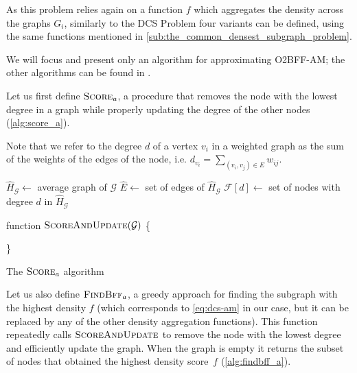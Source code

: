 As this problem relies again on a function $f$ which aggregates the density
across the graphs $G_i$, similarly to the \acrshort{DCS} Problem four variants
can be defined, using the same functions mentioned in
\autoref{sub:the_common_densest_subgraph_problem}.

We will focus and present only an algorithm for approximating
\acrshort{O2BFF}-AM; the other algorithms can be found in
\cite{semertzidis2019finding}.

Let us first define $\textsc{Score}_{a}  $, a procedure that removes the node
with the lowest degree in a graph while properly updating the degree of the
other nodes (\autoref{alg:score_a}).

Note that we refer to the degree $d$ of a vertex $v_{i} $ in a weighted graph as
the sum of the weights of the edges of the node, i.e. $ d_{v_i} = \sum^{}_{(v_{i} , v_{j}
	) \in E} w_{ij}  $.

\begin{algorithm}
	\SetAlgoLined
	$\hat{H}_{\mathcal{G} } \leftarrow $ average graph of $\mathcal{G} $ \;
	$\hat{E} \leftarrow $ set of edges of $\hat{H}_{\mathcal{G} }  $ \;
	$\mathcal{F}[d] \leftarrow $ set of nodes with degree
	$d$ in $\hat{H}_{\mathcal{G} }  $\;

	\bigskip

	{function \textnormal{$\textsc{ScoreAndUpdate}( \mathcal{G} )$ \{ }}
	{}

	\}
	\caption{The $\textsc{Score}_{a}  $ algorithm}
	\label{alg:score_a}
\end{algorithm}

Let us also define $\textsc{FindBff}_{a} $, a greedy approach for finding
the subgraph with the highest density $f$ (which corresponds to
\autoref{eq:dcs-am} in our case, but it can be replaced by any of the other
density aggregation functions). This function repeatedly calls
$\textsc{ScoreAndUpdate}$ to remove the node with the lowest degree and
efficiently update
the graph. When the graph is empty it returns the subset of nodes
that obtained the highest density score~$f$ (\autoref{alg:findbff_a}).

